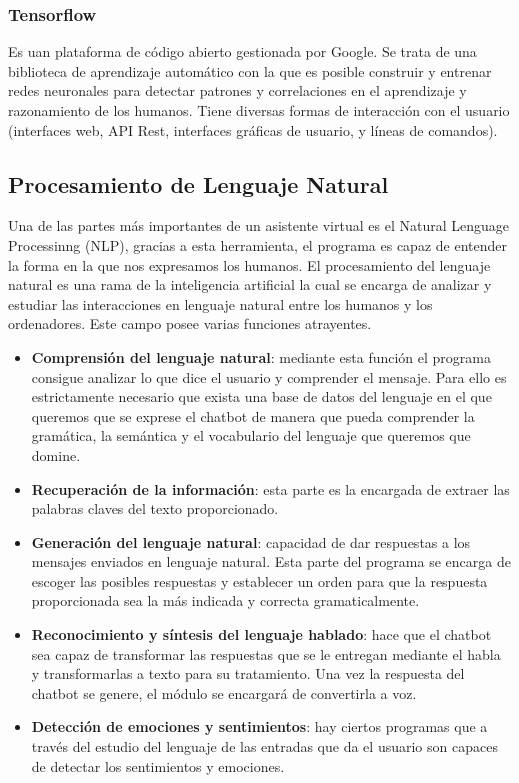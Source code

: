 \subsubsection{Tensorflow} Es uan plataforma de código abierto gestionada por Google. Se trata de una biblioteca de aprendizaje automático con la que es posible construir y entrenar redes neuronales para detectar patrones y correlaciones en el aprendizaje y razonamiento de los humanos. Tiene diversas formas de interacción con el usuario (interfaces web, API Rest, interfaces gráficas de usuario, y líneas de comandos).

\subsection{Procesamiento de Lenguaje Natural}
Una de las partes más importantes de un asistente virtual es el Natural Lenguage Processinng (NLP), gracias a esta herramienta, el programa es capaz de entender la forma en la que nos expresamos los humanos. 
El procesamiento del lenguaje natural es una rama de la inteligencia artificial la cual se encarga de analizar y estudiar las interacciones en lenguaje natural entre los humanos y los ordenadores. Este campo posee varias funciones atrayentes.

\begin{itemize}
    \item \textbf{Comprensión del lenguaje natural}: mediante esta función el programa consigue analizar lo que dice el usuario y comprender el mensaje. Para ello es estrictamente necesario que exista una base de datos del lenguaje en el que queremos que se exprese el chatbot de manera que pueda comprender la gramática, la semántica y el vocabulario del lenguaje que queremos que domine.
    \item \textbf{Recuperación de la información}: esta parte es la encargada de extraer las palabras claves del texto proporcionado.
    \item \textbf{Generación del lenguaje natural}: capacidad de dar respuestas a los mensajes enviados en lenguaje natural. Esta parte del programa se encarga de escoger las posibles respuestas y establecer un orden para que la respuesta proporcionada sea la más indicada y correcta gramaticalmente.
    \item \textbf{Reconocimiento y síntesis del lenguaje hablado}: hace que el chatbot sea capaz de transformar las respuestas que se le entregan mediante el habla y transformarlas a texto para su tratamiento. Una vez la respuesta del chatbot se genere, el módulo se encargará de convertirla a voz.
    \item \textbf{Detección de emociones y sentimientos}: hay ciertos programas que a través del estudio del lenguaje de las entradas que da el usuario son capaces de detectar los sentimientos y emociones.
\end{itemize}

